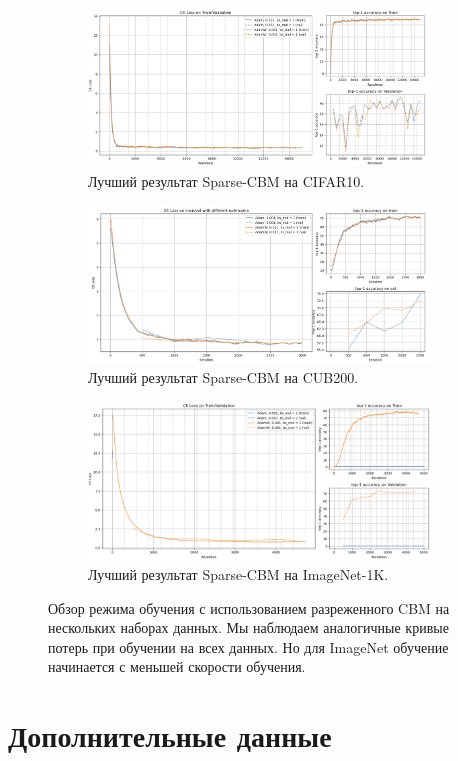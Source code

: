 \begin{figure}[h] %
\centering
   \begin{subfigure}%
     \centering
    \includegraphics[width=0.5\linewidth]{./figures/sparse_cifar10_91.png}
    \caption{Лучший результат Sparse-CBM на CIFAR10.}
    \label{fig:sparse_best_cifar}
    \end{subfigure}
    \begin{subfigure}%
    \centering
      \includegraphics[width=0.5\linewidth]{./figures/sparse_imnet_71.png}
    \caption{Лучший результат Sparse-CBM на CUB200.}
    \label{fig:sparse_best_imnet}
    \end{subfigure}
    \begin{subfigure}%
     \centering
  \includegraphics[width=0.5\linewidth]{./figures/sparse_cub_76.png}
    \caption{Лучший результат Sparse-CBM на ImageNet-1K.}
    \label{fig:sparse_best_cub}
    \end{subfigure}
    \caption{Обзор режима обучения с использованием разреженного CBM на нескольких наборах данных. Мы наблюдаем аналогичные кривые потерь при обучении на всех данных. Но для ImageNet обучение начинается с меньшей скорости обучения.}\label{fig:curves}
\end{figure}

\section{Дополнительные данные}


